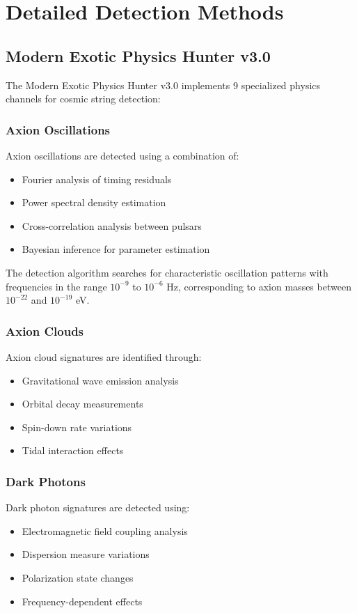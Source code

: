 \section{Detailed Detection Methods}

\subsection{Modern Exotic Physics Hunter v3.0}

The Modern Exotic Physics Hunter v3.0 implements 9 specialized physics channels for cosmic string detection:

\subsubsection{Axion Oscillations}
Axion oscillations are detected using a combination of:
\begin{itemize}
    \item Fourier analysis of timing residuals
    \item Power spectral density estimation
    \item Cross-correlation analysis between pulsars
    \item Bayesian inference for parameter estimation
\end{itemize}

The detection algorithm searches for characteristic oscillation patterns with frequencies in the range $10^{-9}$ to $10^{-6}$ Hz, corresponding to axion masses between $10^{-22}$ and $10^{-19}$ eV.

\subsubsection{Axion Clouds}
Axion cloud signatures are identified through:
\begin{itemize}
    \item Gravitational wave emission analysis
    \item Orbital decay measurements
    \item Spin-down rate variations
    \item Tidal interaction effects
\end{itemize}

\subsubsection{Dark Photons}
Dark photon signatures are detected using:
\begin{itemize}
    \item Electromagnetic field coupling analysis
    \item Dispersion measure variations
    \item Polarization state changes
    \item Frequency-dependent effects
\end{itemize}

